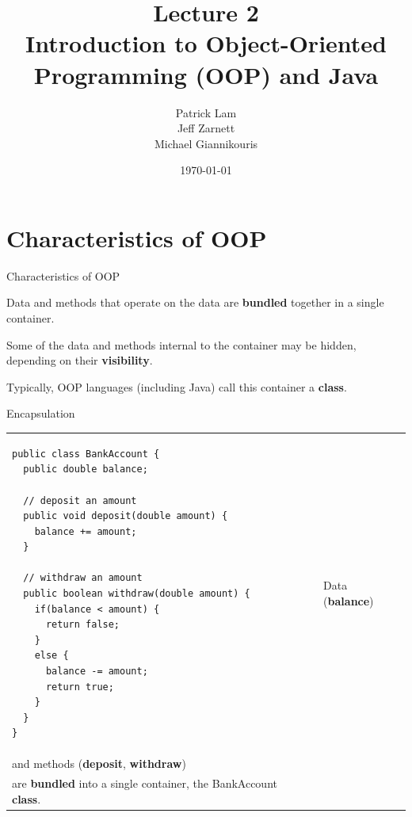 \documentclass[aspectratio=169]{beamer}
\title{Lecture 2 \\ Introduction to Object-Oriented Programming (OOP) and Java}
\date{\today}
\author{Patrick Lam \\ Jeff Zarnett \\ Michael Giannikouris}
\institute{Department of Electrical and Computer Engineering}
\newenvironment{deflist}
{ \begin{description}
    \setlength{\itemsep}{6pt}
    \setlength{\parskip}{0pt}
    \setlength{\parsep}{0pt}     }
{ \end{description}                  }
\begin{document}
\maketitle

\section{Characteristics of OOP}

\begin{frame}{Characteristics of OOP}
	\begin{deflist}
		\item[Encapsulation]
		Data and methods that operate on the data are \textbf{bundled} together in a single container.	
		\item Some of the data and methods internal to the container may be hidden, depending on their \textbf{visibility}.
		\item[] Typically, OOP languages (including Java) call this container a \textbf{class}.
	\end{deflist}
\end{frame}



\begin{frame}[fragile]{Encapsulation}

\centering
\begin{tabular}{@{}m{} | m{}@{} m{}@{}}

\begin{Verbatim}[fontsize=\tiny]
public class BankAccount {
  public double balance;
  
  // deposit an amount
  public void deposit(double amount) {
    balance += amount;
  }
  
  // withdraw an amount
  public boolean withdraw(double amount) {
    if(balance < amount) {
      return false;
    }
    else {
      balance -= amount;
      return true;
    }
  }
}
\end{Verbatim}

&&

\raggedright
Data (\textbf{balance}) 	\\
and methods (\textbf{deposit}, \textbf{withdraw})	\\
are \textbf{bundled} into a single container, the BankAccount \textbf{class}. \\

\end{tabular}

\end{frame}
\end{document}
